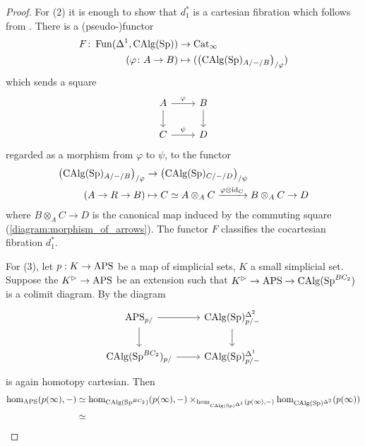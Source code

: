 \begin{proof}
    For (2) it is enough to show that $d_1^*$ is a cartesian fibration which follows from \cite[Corollary 2.4.6.5]{HTT}.  
    There is a (pseudo-)functor
    \begin{align*}
        F \colon \operatorname{Fun}(\Delta^1, \operatorname{CAlg}(\operatorname{Sp})) &\to \operatorname{Cat}_\infty \\
        (\varphi \colon A \to B) &\mapsto (\left(\operatorname{CAlg}(\operatorname{Sp})_{A/-/B}\right)_{/\varphi}) 
    \end{align*}
    which sends a square
    \begin{equation}\label{diagram:morphism_of_arrows}
    \begin{tikzcd}
        A \ar[r,"\varphi"] \ar[d] & B \ar[d] \\
        C \ar[r,"\psi"] & D 
    \end{tikzcd}
    \end{equation}
    regarded as a morphism from $ \varphi $ to $ \psi $, to the functor
    \begin{equation}
    \begin{split}
        \left(\operatorname{CAlg}(\operatorname{Sp})_{A/-/B}\right)_{/\varphi} &\to \left(\operatorname{CAlg}(\operatorname{Sp})_{C/-/D}\right)_{/\psi} \\
        (A \to R \to B) & \mapsto C \simeq A \otimes_A C \xrightarrow{\varphi \otimes \mathrm{id}_C} B \otimes_A C \to D
    \end{split}
    \end{equation}
    where $ B \otimes_A C \to D $ is the canonical map induced by the commuting square (\ref{diagram:morphism_of_arrows}). 
    The functor $ F $ classifies the cocartesian fibration $ d_1^* $. 

    For (3), let $p:K\to \mathrm{APS}$ be a map of simplicial sets, $K$ a small simplicial set. Suppose the $K^\vartriangleright\to \mathrm{APS}$ be an extension such that $K^\vartriangleright\to \mathrm{APS}\to \operatorname{CAlg}(\operatorname{Sp}^{BC_2})$ is a colimit diagram. By \cite[Proposition 2.4.3.2]{HTT} the diagram \[\begin{tikzcd}
        \aps_{p/}\arrow[r]\arrow[d] &\CAlg(\Sp)^{\Delta^2}_{p/-}\arrow[d]\\
        \CAlg(\Sp^{BC_2})_{p/}\arrow[r] & \CAlg(\Sp)^{\Delta^1}_{p/-}
    \end{tikzcd}\] is again homotopy cartesian. Then 
    \begin{align*}
        \hom_{\mathrm{APS}}(p(\infty), -)&\simeq \hom_{\operatorname{CAlg}(\operatorname{Sp}^{BC_2})}(p(\infty), -)\times_{\hom_{\operatorname{CAlg}(\operatorname{Sp})^{\Delta^1}}(p(\infty),-)}\hom_{\operatorname{CAlg}(\operatorname{Sp})^{\Delta^2}}(p(\infty))\\
        &\simeq 
    \end{align*}
\end{proof}

